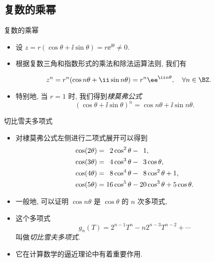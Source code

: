 \subsection{复数的乘幂}

\begin{frame}{复数的乘幂}
	\begin{itemize}
		\item 设 $z=r(\cos\theta+\ii\sin\theta)=r\ee^{\ii\theta}\neq0$.
		\item 根据复数三角和指数形式的乘法和除法运算法则, 我们有
	\end{itemize}
	\onslide<+->
	\begin{theorem}[][复数的乘幂]
	\[
		z^n=r^n(\cos{n\theta}+\ii\sin{n\theta})
		=r^n\ee^{\ii n\theta},\quad\forall n\in\BZ.
	\]
	\end{theorem}
	\begin{itemize}
		\item 特别地, 当 $r=1$ 时, 我们得到\emph{棣莫弗公式}
		\[
			(\cos\theta+\ii\sin\theta)^n=\cos{n\theta}+\ii\sin{n\theta}.
		\]
	\end{itemize}
\end{frame}


\begin{frame}{切比雪夫多项式\noexer}
	\begin{itemize}
		\item 对棣莫弗公式左侧进行二项式展开可以得到
		\begin{align*}
			\cos(2\theta)&=\hphantom{1}2\cos^2\theta-\hphantom{1}1,\\
			\cos(3\theta)&=\hphantom{1}4\cos^3\theta-\hphantom{1}3\cos\theta,\\
			\cos(4\theta)&=\hphantom{1}8\cos^4\theta-\hphantom{1}8\cos^2\theta+1,\\
			\cos(5\theta)&=16\cos^5\theta-20\cos^3\theta+5\cos\theta.
		\end{align*}
		\item 一般地, 可以证明 $\cos{n\theta}$ 是 $\cos\theta$ 的 $n$ 次多项式,
		\item 这个多项式
		\[
			g_n(T)=2^{n-1}T^n-n2^{n-3}T^{n-2}+\cdots
		\]
		叫做\emph{切比雪夫多项式}.
		\item 它在计算数学的逼近理论中有着重要作用.
	\end{itemize}
\end{frame}


